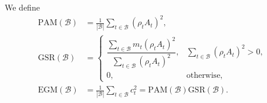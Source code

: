 \documentclass{article}
\newcommand{\egm}{\mathrm{EGM}}
\newcommand{\pam}{\mathrm{PAM}}
\newcommand{\gsr}{\mathrm{GSR}}
\begin{document}
We define
\begin{align}
  \pam(\mathcal{B})
    &=\frac{1}{|\mathcal{B}|}\sum_{t\in\mathcal{B}}(\rho_t A_t)^2,
    \label{eq:pam}\\
  \gsr(\mathcal{B})
    &=\begin{cases}
       \dfrac{\sum_{t\in\mathcal{B}} m_t(\rho_t A_t)^2}
             {\sum_{t\in\mathcal{B}}(\rho_t A_t)^2}, & \sum_{t\in\mathcal{B}}(\rho_t A_t)^2>0,\\[7pt]
       0, & \text{otherwise,}
      \end{cases}
    \label{eq:gsr}\\
  \egm(\mathcal{B})
    &=\frac{1}{|\mathcal{B}|}\sum_{t\in\mathcal{B}}c_t^2
      =\pam(\mathcal{B})\gsr(\mathcal{B}).
    \label{eq:egm}
\end{align}
\end{document}

